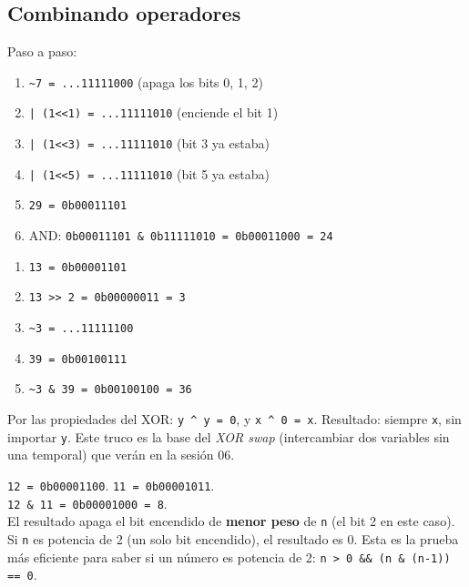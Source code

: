 \documentclass[12pt, oneside]{article}
\begin{document}
\subsection{Combinando operadores}

\begin{notaprofesor}
  Paso a paso:
  \begin{enumerate}
    \item \texttt{\textasciitilde 7 = ...11111000} (apaga los bits 0, 1, 2)
    \item \texttt{| (1<<1) = ...11111010} (enciende el bit 1)
    \item \texttt{| (1<<3) = ...11111010} (bit 3 ya estaba)
    \item \texttt{| (1<<5) = ...11111010} (bit 5 ya estaba)
    \item \texttt{29 = 0b00011101}
    \item AND: \texttt{0b00011101 \& 0b11111010 = 0b00011000 = 24}
  \end{enumerate}
\end{notaprofesor}

\begin{notaprofesor}
  \begin{enumerate}
    \item \texttt{13 = 0b00001101}
    \item \texttt{13 >> 2 = 0b00000011 = 3}
    \item \texttt{\textasciitilde 3 = ...11111100}
    \item \texttt{39 = 0b00100111}
    \item \texttt{\textasciitilde 3 \& 39 = 0b00100100 = 36}
  \end{enumerate}
\end{notaprofesor}

\begin{notaprofesor}
  Por las propiedades del XOR: \texttt{y \^{} y = 0}, y \texttt{x \^{} 0 = x}.
  Resultado: siempre \texttt{x}, sin importar \texttt{y}.
  Este truco es la base del \textit{XOR swap} (intercambiar dos variables
  sin una temporal) que verán en la sesión 06.
\end{notaprofesor}

\begin{notaprofesor}[Ejercicio 9 — \texttt{n \& (n-1)} con \texttt{n = 12}]
  \texttt{12 = 0b00001100}. \quad \texttt{11 = 0b00001011}.\\[4pt]
  \texttt{12 \& 11 = 0b00001000 = 8}.\\[4pt]
  El resultado apaga el bit encendido de \textbf{menor peso} de \texttt{n}
  (el bit 2 en este caso). Si \texttt{n} es potencia de 2 (un solo bit
  encendido), el resultado es 0. Esta es la prueba más eficiente para
  saber si un número es potencia de 2: \texttt{n > 0 \&\& (n \& (n-1)) == 0}.
\end{notaprofesor}
\end{document}
